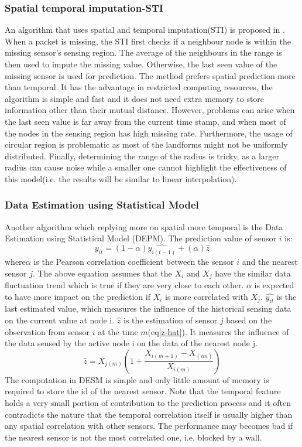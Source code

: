 \subsubsection{Spatial temporal imputation-STI}
An algorithm that uses spatial and temporal imputation(STI) is proposed in \cite{li2008spatial}. 
When a packet is missing, the STI first checks if a neighbour node is within the missing sensor's sensing region. 
The average of the neighbours in the range is then used to impute the missing value. 
Otherwise, the last seen value of the missing sensor is used for prediction. 
The method prefers spatial prediction more than temporal. 
It has the advantage in restricted computing resources, the algorithm is simple and fast and it does not need extra memory to store information other than their mutual distance.
However, problems can arise when the last seen value is far away from the current time stamp, and when most of the nodes in the sensing region has high missing rate. 
Furthermore, the usage of circular region is problematic as most of the landforms might not be uniformly distributed. Finally, determining the range of the radius is tricky, as a larger radius can cause noise while a smaller one cannot highlight the effectiveness of this model(i.e. the results will be similar to linear interpolation).
\subsubsection{Data Estimation using Statistical Model}
Another algorithm which replying more on spatial more temporal is the Data Estimation using Statistical Model (DEPM)\cite{li2008data}.  
The prediction value of sensor $i$ is:
\begin{equation}
\hat{y_{it}} = (1-\alpha)\hat{y_{i(t-1)}} + (\alpha)\hat{z}
\end{equation}
where$\alpha$ is the Pearson correlation coefficient between the sensor $i$ and the nearest sensor $j$.
The above equation assumes that the $X_i$ and $X_j$ have the similar data fluctuation trend which is true if they are very close to each other. 
$\alpha$ is expected to have more impact on the prediction if $X_i$ is more correlated with $X_j$. 
$\hat{y_{it}}$ is the last estimated value, which measures the influence of the historical sensing data on the current value at node i. 
$\hat{z}$ is the estimation of sensor $j$ based on the observation from sensor $i$ at the time $m$(eq\ref{z-hat}). It measures the influence of the data sensed by the active node i on the data of the nearest node j.  
\begin{equation}
\hat{z} = X_{j(m)}(1+\frac{X_{i(m+1)}-X_{(im)}}{X_{i(m)}})
\label{z-hat}
\end{equation}
The computation in DESM is simple and only little amount of memory is required to store the id of the nearest sensor. 
Note that the temporal feature holds a very small portion of contribution to the prediction process and it often contradicts the nature that the temporal correlation itself is usually higher than any spatial correlation with other sensors. The performance may becomes bad if the nearest sensor is not the most correlated one, i.e. blocked by a wall.
